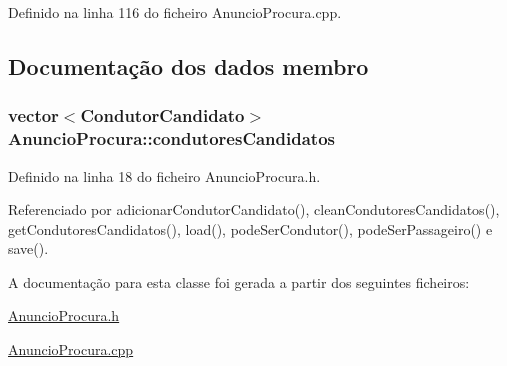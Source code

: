 Definido na linha 116 do ficheiro Anuncio\+Procura.\+cpp.



\subsection{Documentação dos dados membro}
\hypertarget{class_anuncio_procura_a610f0c6542e76bb10e81850e5db7db8a}{
\subsubsection[{condutores\+Candidatos}]{\setlength{\rightskip}{0pt plus 5cm}vector$<${\bf Condutor\+Candidato}$>$ Anuncio\+Procura\+::condutores\+Candidatos\hspace{0.3cm}{\ttfamily [private]}}}\label{class_anuncio_procura_a610f0c6542e76bb10e81850e5db7db8a}


Definido na linha 18 do ficheiro Anuncio\+Procura.\+h.



Referenciado por adicionar\+Condutor\+Candidato(), clean\+Condutores\+Candidatos(), get\+Condutores\+Candidatos(), load(), pode\+Ser\+Condutor(), pode\+Ser\+Passageiro() e save().



A documentação para esta classe foi gerada a partir dos seguintes ficheiros\+:\begin{DoxyCompactItemize}
\item 
\hyperlink{_anuncio_procura_8h}{Anuncio\+Procura.\+h}\item 
\hyperlink{_anuncio_procura_8cpp}{Anuncio\+Procura.\+cpp}\end{DoxyCompactItemize}
